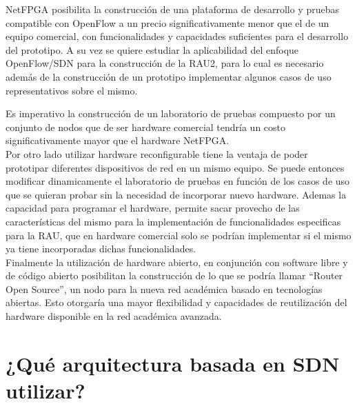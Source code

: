 NetFPGA posibilita la construcci\'on de una plataforma de desarrollo y pruebas compatible con OpenFlow a un precio significativamente menor que el de un equipo comercial, con funcionalidades y capacidades suficientes para el desarrollo del prototipo. A su vez se quiere estudiar la aplicabilidad del enfoque OpenFlow/SDN para la construcción de la RAU2, para lo cual es necesario adem\'as de la construcción de un prototipo implementar algunos casos de uso representativos sobre el mismo. 

Es imperativo la construcción de un laboratorio de pruebas compuesto por un conjunto de nodos que de ser hardware comercial tendría un costo significativamente mayor que el hardware NetFPGA.\\

Por otro lado utilizar hardware reconfigurable tiene la ventaja de poder prototipar diferentes dispositivos de red en un mismo equipo. Se puede entonces modificar dinamicamente el laboratorio de pruebas en función de los casos de uso que se quieran probar sin la necesidad de incorporar nuevo hardware. Ademas la capacidad para programar el hardware, permite sacar provecho de las características del mismo para la implementaci\'on de funcionalidades especificas para la RAU, que en hardware comercial solo se podrían implementar si el mismo ya tiene incorporadas dichas funcionalidades.\\

Finalmente la utilizaci\'on de hardware abierto, en conjunci\'on con software libre y de código abierto posibilitan la construcci\'on de lo que se podría llamar “Router Open Source”, un nodo para la nueva red académica basado en tecnologías abiertas. Esto otorgaría una mayor flexibilidad y capacidades de reutilizaci\'on del hardware disponible en la red académica avanzada.

\section[¿Qu\'e arquitectura basada en SDN utilizar?]{¿Qu\'e arquitectura basada en SDN utilizar?}


 
